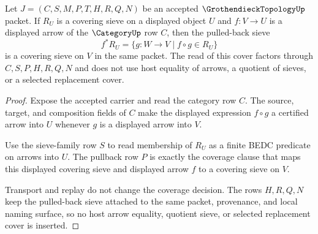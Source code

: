 \begin{theorem}
\label{thm:grothendieck-topology-sieve-pullback-stability}
Let $J=(C,S,M,P,T,H,R,Q,N)$ be an accepted $\GrothendieckTopologyUp$ packet. If $R_U$ is a covering sieve on a displayed object $U$ and $f:V\to U$ is a displayed arrow of the $\CategoryUp$ row $C$, then the pulled-back sieve
$$
f^{\ast}R_U=\{g:W\to V \mid f\circ g\in R_U\}
$$
is a covering sieve on $V$ in the same packet. The read of this cover factors through $C,S,P,H,R,Q,N$ and does not use host equality of arrows, a quotient of sieves, or a selected replacement cover.
\end{theorem}
\begin{proof}
Expose the accepted carrier and read the category row $C$. The source, target, and composition fields of $C$ make the displayed expression $f\circ g$ a certified arrow into $U$ whenever $g$ is a displayed arrow into $V$.

Use the sieve-family row $S$ to read membership of $R_U$ as a finite BEDC predicate on arrows into $U$. The pullback row $P$ is exactly the coverage clause that maps this displayed covering sieve and displayed arrow $f$ to a covering sieve on $V$.

Transport and replay do not change the coverage decision. The rows $H,R,Q,N$ keep the pulled-back sieve attached to the same packet, provenance, and local naming surface, so no host arrow equality, quotient sieve, or selected replacement cover is inserted.
\end{proof}

